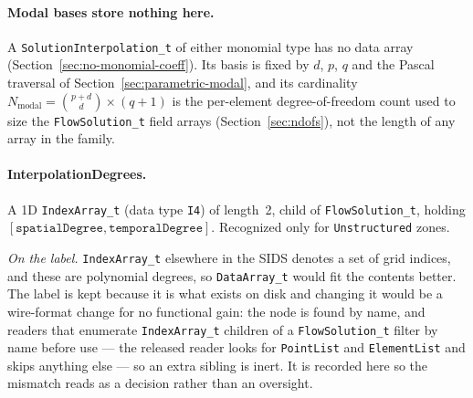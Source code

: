 \documentclass[11pt,letterpaper]{article}
\newif\ifvfourdraft
\newcommand{\vfour}[1]{\ifvfourdraft\textcolor{v4violet}{#1}\else#1\fi}
\newcommand{\vfourmark}{\ifvfourdraft\textcolor{v4violet}{\textbf{[v4]}}\ \fi}
\begin{document}
\paragraph{\vfourmark Modal bases store nothing here.}
A \texttt{SolutionInterpolation\_t} of either monomial type has no data array
(Section~\ref{sec:no-monomial-coeff}).  Its basis is fixed by $d$, $p$, $q$ and the
Pascal traversal of Section~\ref{sec:parametric-modal}, and its cardinality
$N_\mathrm{modal} = \binom{p+d}{d}\times(q+1)$ is the per-element
degree-of-freedom count used to size the \texttt{FlowSolution\_t} field arrays
(Section~\ref{sec:ndofs}), not the length of any array in the family.

\paragraph{InterpolationDegrees.}
A 1D \texttt{IndexArray\_t} (data type \texttt{I4}) of length~2, child of
\texttt{FlowSolution\_t}, holding $[\texttt{spatialDegree}, \texttt{temporalDegree}]$.  Recognized
only for \texttt{Unstructured} zones.

\vfour{\emph{On the label.}  \texttt{IndexArray\_t} elsewhere in the SIDS denotes a
set of grid indices, and these are polynomial degrees, so \texttt{DataArray\_t}
would fit the contents better.  The label is kept because it is what exists on
disk and changing it would be a wire-format change for no functional gain: the
node is found by name, and readers that enumerate \texttt{IndexArray\_t} children
of a \texttt{FlowSolution\_t} filter by name before use --- the released reader
looks for \texttt{PointList} and \texttt{ElementList} and skips anything else ---
so an extra sibling is inert.  It is recorded here so the mismatch reads as a
decision rather than an oversight.}
\end{document}
